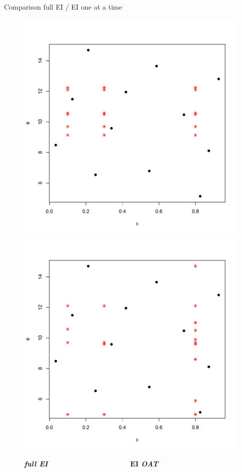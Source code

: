 \documentclass[nopagenumber,9pt]{beamer}
\begin{document}
 
\begin{frame}{Comparison full EI / EI one at a time}


\begin{figure}[ht!]
\centering
\caption{\textit{\textbf{full EI}\,\,\,\,\,\,\,\,\,\,\,\,\,\,\,\,\,\,\,\,\,\,\,\,\,\,\,\,\,\,\,\,\,\,\,\,\,\,\,\,\,\,\,\,\,\,\,\,\,\,\,\,\,\,\,\,\,\,\,\,\,\,\,\,\,\,\,\,\,\,$\mathbf{EI}$ \textbf{OAT}}}
\vspace*{-0.7cm}
\includegraphics[scale=0.33]{design_algo1.pdf}
\includegraphics[scale=0.33]{design_algo2bis.pdf}
\end{figure}


\end{frame}
\end{document}

